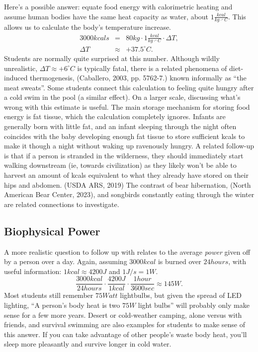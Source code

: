 \documentclass[11pt,letter]{article}
\newcommand{\be}{\begin{equation}}
\newcommand{\ee}{\end{equation}}
\newcommand{\bea}{\begin{eqnarray}}
\newcommand{\eea}{\end{eqnarray}}
\newcommand{\degC}{^{\circ}C}
\begin{document}
Here's a possible answer:
equate food energy with calorimetric heating and assume human bodies have the same heat capacity as water, about $1\frac{kcal}{kg\cdot\degC}$. This allows us to calculate the body's temperature increase.
\bea
3000kcals &=& 80kg\cdot1 \frac{kcal}{kg\cdot \degC}\cdot\Delta T ,  \\
\Delta T &\approx& +37.5\degC . 
\eea
Students are normally quite surprised at this number.  Although wildly unrealistic, $\Delta T \approx +6\degC$ is typically fatal, there is a related phenomena of diet-induced thermogenesis,
(Caballero, 2003, pp. 5762-7.)
known informally as ``the meat sweats''. Some students connect this calculation to feeling quite hungry after a cold swim in the pool (a similar effect).  On a larger scale, discussing what's wrong with this estimate is useful.  The main storage mechanism for storing food energy is fat tissue, which the calculation completely ignores.  Infants are generally born with little fat, and an infant sleeping through the night often coincides with the baby developing enough fat tissue to store sufficient kcals to make it though a night without waking up ravenously hungry.  A related follow-up is that if a person is stranded in the wilderness, they should immediately start walking downstream (ie, towards civilization) as they likely won't be able to harvest an amount of kcals equivalent to what they already have stored on their hips and abdomen. (USDA ARS, 2019)  The contrast of bear hibernation, (North American Bear Center, 2023), and songbirds constantly eating through the winter are related connections to investigate.

\subsection{Biophysical Power}
A more realistic question to follow up with relates to the average \textit{power} given off by a person over a day.  
Again, assuming $3000kcal$ is burned over $24 hours$, with useful information: $1 kcal \approx 4200J$ and $1 J/s=1W$.
\be
\frac{3000kcal}{24hours}\cdot\frac{4200J}{1kcal}\cdot\frac{1hour}{3600sec}\approx145W .
\ee
Most students still remember $75Watt$ lightbulbs, but given the spread of LED lighting, ``A person's body heat is two $75W$ light bulbs'' will probably only make sense for a few more years.  Desert or cold-weather camping, alone versus with friends, and survival swimming are also examples for students to make sense of this answer.  If you can take advantage of other people's waste body heat, you'll sleep more pleasantly and survive longer in cold water.  
\end{document}
